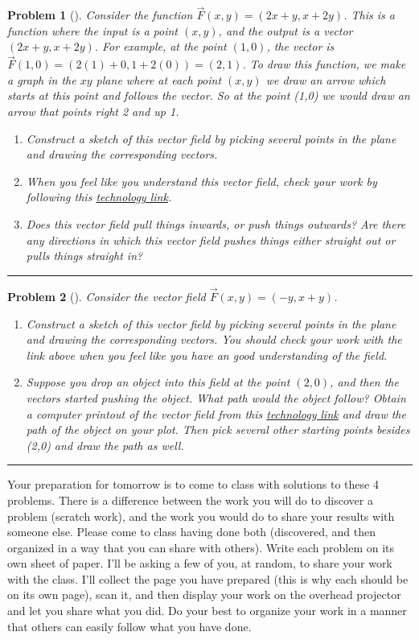 \documentclass[letterpaper,oneside]{book}%
\theoremstyle{plain}
\theoremstyle{box}
\theoremstyle{problem}
\newtheorem{problemnum}{Problem}[chapter]
\newenvironment{problem}[1][]{\begin{problemnum}[#1]}{\end{problemnum}\nopagebreak\hrule\bigskip}
\begin{document}
\begin{problem}
 Consider the function $\vec F(x,y) = (2x+y, x+2y)$. This is a function where the input is a point $(x,y)$, and the output is a vector $(2x+y,x+2y)$. For example, at the point $(1,0)$, the vector is $\vec F(1,0) = (2(1)+0,1+2(0))=(2,1)$.  To draw this function, we make a graph in the $xy$ plane where at each point $(x,y)$ we draw an arrow which starts at this point and follows the vector. So at the point (1,0) we would draw an arrow that points right 2 and up 1.  
\begin{enumerate}
 \item Construct a sketch of this vector field by picking several points in the plane and drawing the corresponding vectors.  
 \item When you feel like you understand this vector field, check your work by following this \href{http://bmw.byuimath.com/dokuwiki/doku.php?id=vector_field_plotter}{technology link}.
 \item Does this vector field pull things inwards, or push things outwards?  
Are there any directions in which this vector field pushes things either straight out or pulls things straight in?
\end{enumerate}
\end{problem}


\begin{problem}
 Consider the vector field $\vec F(x,y) = (-y, x+y)$. 
\begin{enumerate}
 \item Construct a sketch of this vector field by picking several points in the plane and drawing the corresponding vectors.  You should check your work with the link above when you feel like you have an good understanding of the field.
 \item Suppose you drop an object into this field at the point $(2,0)$, and then the vectors started pushing the object. What path would the object follow?  Obtain a computer printout of the vector field from this \href{http://bmw.byuimath.com/dokuwiki/doku.php?id=vector_field_plotter}{technology link} and draw the path of the object on your plot.  Then pick several other starting points besides (2,0) and draw the path as well.
\end{enumerate}
\end{problem}


Your preparation for tomorrow is to come to class with solutions to these 4 problems. There is a difference between the work you will do to discover a problem (scratch work), and the work you would do to share your results with someone else. Please come to class having done both (discovered, and then organized in a way that you can share with others).  Write each problem on its own sheet of paper.  I'll be asking a few of you, at random, to share your work with the class.  I'll collect the page you have prepared (this is why each should be on its own page), scan it, and then display your work on the overhead projector and let you share what you did. Do your best to organize your work in a manner that others can easily follow what you have done. 
\end{document}
